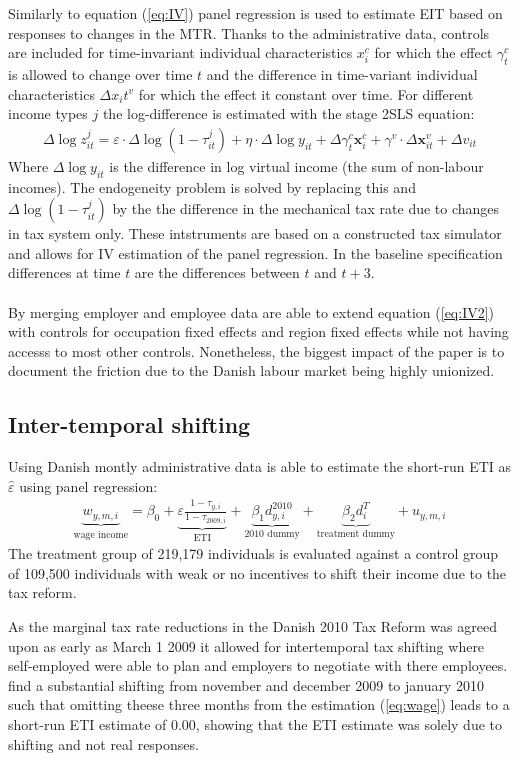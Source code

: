 Similarly to equation (\ref{eq:IV}) panel regression is used to estimate EIT based on responses to changes in the MTR. Thanks to the administrative data, controls are included for time-invariant individual characteristics $x_i^c$ for which the effect $\gamma_t^c$ is allowed to change over time $t$ and the difference in time-variant individual characteristics $\Delta x_it^v$ for which the effect it constant over time. For different income types $j$ the log-difference is estimated with the  stage 2SLS equation:
\begin{align}
  \Delta\log z_{it}^j = \varepsilon\cdot\Delta\log(1-\tau_{it}^j) + \eta\cdot\Delta\log y_{it} + \Delta\gamma_t^c \bm{x}_i^c + \gamma^v\cdot\Delta\bm{x}_{it}^v + \Delta v_{it}
  \label{eq:IV2}
\end{align}
Where $\Delta \log y_{it}$ is the difference in log virtual income (the sum of non-labour incomes). The endogeneity problem is solved by replacing this and $\Delta \log (1-\tau_{it}^j)$ by the the difference in the mechanical tax rate due to changes in tax system only. These intstruments are based on a constructed tax simulator and allows for IV estimation of the panel regression. In the baseline specification differences at time $t$ are the differences between $t$ and $t+3$.
\\
\\
By merging employer and employee data \citet{chetty2011adjustment} are able to extend equation (\ref{eq:IV2}) with controls for occupation fixed effects and region fixed effects while not having accesss to most other controls. Nonetheless, the biggest impact of the paper is to document the friction due to the Danish labour market being highly unionized.

\subsection{Inter-temporal shifting}
Using Danish montly administrative data \citet{kreiner2016tax} is able to estimate the short-run ETI as $\hat{\varepsilon}$ using panel regression:
\begin{align}
  \underbrace{w_{y,m,i}}_\text{wage income} = \beta_0 + \underbrace{\varepsilon\frac{1-\tau_{y,i}}{1-\tau_{2009,i}}}_\text{ETI} + \underbrace{\beta_1d_{y,i}^{2010}}_\text{2010 dummy} + \underbrace{\beta_2d_i^T}_\text{treatment dummy} + u_{y,m,i}
  \label{eq:wage}
\end{align}
The treatment group of 219,179 individuals is evaluated against a control group of 109,500 individuals with weak or no incentives to shift their income due to the tax reform.

As the marginal tax rate reductions in the Danish 2010 Tax Reform was agreed upon as early as March 1 2009 it allowed for intertemporal tax shifting where self-employed were able to plan and employers to negotiate with there employees. \citet{kreiner2016tax} find a substantial shifting from november and december 2009 to january 2010 such that omitting theese three months from the estimation (\ref{eq:wage}) leads to a short-run ETI estimate of 0.00, showing that the ETI estimate was solely due to shifting and not real responses.

